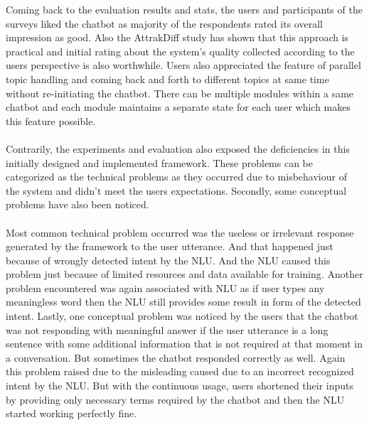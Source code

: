 Coming back to the evaluation results and stats, the users and participants of the surveys liked the chatbot as majority of the respondents rated its overall impression as good. Also the AttrakDiff study has shown that this approach is practical and initial rating about the system's quality collected according to the users perspective is also worthwhile. Users also appreciated the feature of parallel topic handling and coming back and forth to different topics at same time without re-initiating the chatbot. There can be multiple modules within a same chatbot and each module maintains a separate state for each user which makes this feature possible.
\\~\\
Contrarily, the experiments and evaluation also exposed the deficiencies in this initially designed and implemented framework. These problems can be categorized as the technical problems as they occurred due to misbehaviour of the system and didn't meet the users expectations. Secondly, some conceptual problems have also been noticed.
\\~\\
Most common technical problem occurred was the useless or irrelevant response generated by the framework to the user utterance. And that happened just because of wrongly detected intent by the NLU. And the NLU caused this problem just because of limited resources and data available for training. Another problem encountered was again associated with NLU as if user types any meaningless word then the NLU still provides some result in form of the detected intent. Lastly, one conceptual problem was noticed by the users that the chatbot was not responding with meaningful answer if the user utterance is a long sentence with some additional information that is not required at that moment in a conversation. But sometimes the chatbot responded correctly as well. Again this problem raised due to the misleading caused due to an incorrect recognized intent by the NLU. But with the continuous usage, users shortened their inputs by providing only necessary terms required by the chatbot and then the NLU started working perfectly fine.

